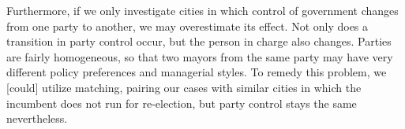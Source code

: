 \documentclass[11pt]{article}
\begin{document}
Furthermore, if we only investigate cities in which control of government changes from one party to another, we may overestimate its effect. Not only does a transition in party control occur, but the person in charge also changes. Parties are fairly homogeneous, so that two mayors from the same party may have very different policy preferences and managerial styles. To remedy this problem, we [could] utilize matching, pairing our cases with similar cities in which the incumbent does not run for re-election, but party control stays the same nevertheless.





\end{document}
